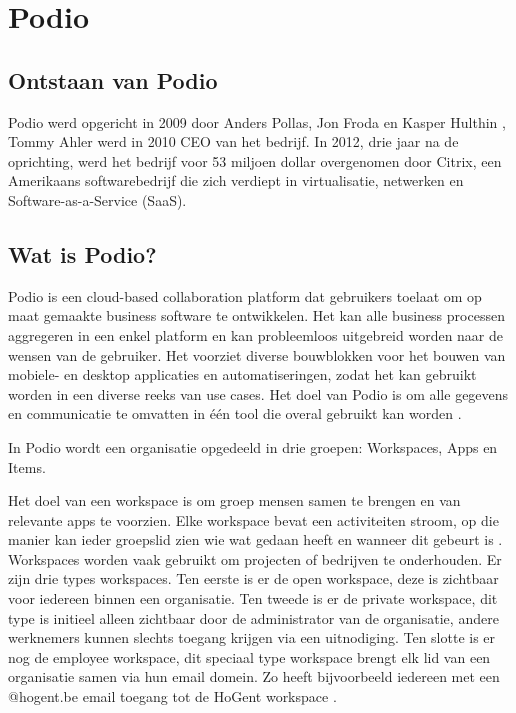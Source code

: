 \section{Podio}


\subsection{Ontstaan van Podio}

Podio werd opgericht in 2009 door Anders Pollas, Jon Froda en Kasper Hulthin \autocite{Crunchbase}, Tommy Ahler werd in 2010 CEO van het bedrijf. In 2012, drie jaar na de oprichting, werd het bedrijf voor 53 miljoen dollar overgenomen door Citrix, een Amerikaans softwarebedrijf die zich verdiept in virtualisatie, netwerken en Software-as-a-Service (SaaS).

\subsection{Wat is Podio?}


Podio is een cloud-based collaboration platform dat gebruikers toelaat om op maat gemaakte business software te ontwikkelen. Het kan alle business processen aggregeren in een enkel platform en kan probleemloos uitgebreid worden naar de wensen van de gebruiker. Het voorziet diverse bouwblokken voor het bouwen van mobiele- en desktop applicaties en automatiseringen, zodat het kan gebruikt worden in een diverse reeks van use cases. Het doel van Podio is om alle gegevens en communicatie te omvatten in één tool die overal gebruikt kan worden \autocite{Podio}.  

In Podio wordt een organisatie opgedeeld in drie groepen: Workspaces, Apps en Items. 


Het doel van een workspace is om groep mensen samen te brengen en van relevante apps te voorzien. Elke workspace bevat een activiteiten stroom, op die manier kan ieder groepslid zien wie wat gedaan heeft en wanneer dit gebeurt is \autocite{TallyfyPodio}. Workspaces worden vaak gebruikt om projecten of bedrijven te onderhouden. Er zijn drie types workspaces. Ten eerste is er de open workspace, deze is zichtbaar voor iedereen binnen een organisatie. Ten tweede is er de private workspace, dit type is initieel alleen zichtbaar door de administrator van de organisatie, andere werknemers kunnen slechts toegang krijgen via een uitnodiging. Ten slotte is er nog de employee workspace, dit speciaal type workspace brengt elk lid van een organisatie samen via hun email domein. Zo heeft bijvoorbeeld iedereen met een @hogent.be email toegang tot de HoGent workspace \autocite{PodioFeatures}.

